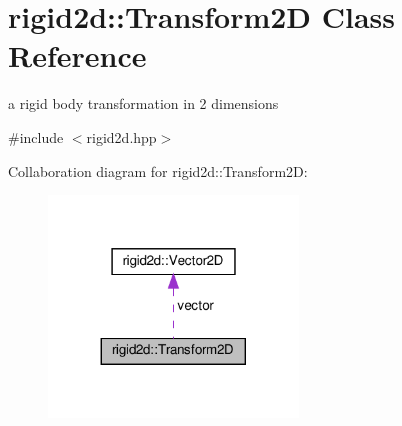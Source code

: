 \hypertarget{classrigid2d_1_1Transform2D}{}\section{rigid2d\+:\+:Transform2D Class Reference}
\label{classrigid2d_1_1Transform2D}


a rigid body transformation in 2 dimensions  




{\ttfamily \#include $<$rigid2d.\+hpp$>$}



Collaboration diagram for rigid2d\+:\+:Transform2D\+:
\nopagebreak
\begin{figure}[H]
\begin{center}
\leavevmode
\includegraphics[width=188pt]{classrigid2d_1_1Transform2D__coll__graph}
\end{center}
\end{figure}
